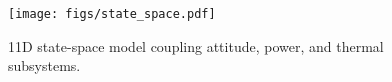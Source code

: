 \begin{figure}[ht]
\centering
\texttt{[image: figs/state\_space.pdf]}
\caption{11D state-space model coupling attitude, power, and thermal subsystems.}
\label{fig:state_space}
\end{figure}
